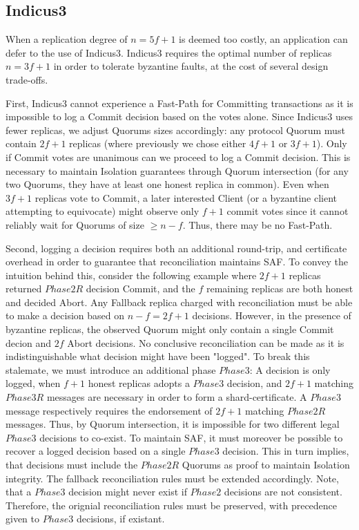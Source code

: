 \subsection{Indicus3}
When a replication degree of $n =5f+1$ is deemed too costly, an application can defer to the use of Indicus3. Indicus3 requires the optimal number of replicas $n = 3f+1$ in order to tolerate byzantine faults, at the cost of several design trade-offs.

First, Indicus3 cannot experience a Fast-Path for Committing transactions as it is impossible to log a Commit decision based on the votes alone. Since Indicus3 uses fewer replicas, we adjust Quorums sizes accordingly: any protocol Quorum must contain $2f+1$ replicas (where previously we chose either $4f+1$ or $3f+1$). Only if Commit votes are unanimous can we proceed to log a Commit decision. This is necessary to maintain Isolation guarantees through Quorum intersection (for any two Quorums, they have at least one honest replica in common). Even when $3f+1$ replicas vote to Commit, a later interested Client (or a byzantine client attempting to equivocate) might observe only $f+1$ commit votes since it cannot reliably wait for Quorums of size $\geq n-f$. Thus, there may be no Fast-Path. 

Second, logging a decision requires both an additional round-trip, and certificate overhead in order to guarantee that reconciliation maintains SAF. To convey the intuition behind this, consider the following example where $2f+1$ replicas returned $Phase2R$ decision Commit, and the $f$ remaining replicas are both honest and decided Abort. Any Fallback replica charged with reconciliation must be able to make a decision based on $n-f = 2f+1$ decisions. However, in the presence of byzantine replicas, the observed Quorum might only contain a single Commit decion and $2f$ Abort decisions. No conclusive reconciliation can be made as it is indistinguishable what decision might have been "logged". To break this stalemate, we must introduce an additional phase $Phase3$: A decision is only logged, when $f+1$ honest replicas adopts a $Phase3$ decision, and $2f+1$ matching $Phase3R$ messages are necessary in order to form a shard-certificate. A $Phase3$ message respectively requires the endorsement of $2f+1$ matching $Phase2R$ messages. Thus, by Quorum intersection, it is impossible for two different legal $Phase3$ decisions to co-exist. To maintain SAF, it must moreover be possible to recover a logged decision based on a single $Phase3$ decision. This in turn implies, that decisions must include the $Phase2R$ Quorums as proof to maintain Isolation integrity. The fallback reconciliation rules must be extended accordingly. Note, that a $Phase3$ decision might never exist if $Phase2$ decisions are not consistent. Therefore, the orignial reconciliation rules must be preserved, with precedence given to $Phase3$ decisions, if existant.

